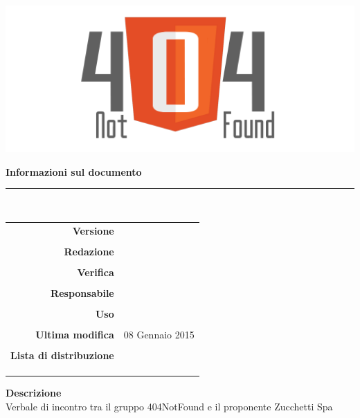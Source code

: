 \thispagestyle{empty}

\begin{titlepage}

	\begin{center}
	\begin{Huge}
		\textbf{\gruppo} \\
	\end{Huge}
	\vspace{0.5cm}
	\begin{Large}
		\textbf{\capitolato}
	\end{Large}
	
	\vspace{1cm}

	\includegraphics[scale=0.35]{../logo/logo404_Extends.png}
	\vspace{1cm}
	\begin{Huge}
		\textbf{\titDoc}
	\end{Huge}
	
	\vspace{1cm}
	\textbf{Informazioni sul documento}\\
	\rule{10cm}{.4pt} \\
	\begin{table}[h]
	\begin{center}
	\begin{tabular}{r | l}
		\textbf{Versione} & \versione \\ \\
		\textbf{Redazione} & \CaMa\\ \\
		\textbf{Verifica} & \CoMa \\ \\
		\textbf{Responsabile} & \VeFe \\ \\
		\textbf{Uso} & \uso \\ \\
		\textbf{Ultima modifica} & 08 Gennaio 2015 \\ \\
		\textbf{Lista di distribuzione} & \gruppo \\ 
			& \Vardanega \\
			& \Cardin \\
			& \Zucchetti \\
	\end{tabular}
	\end{center}
	\end{table}
		\textbf{Descrizione} \\
		Verbale di incontro tra il gruppo 404NotFound e il proponente Zucchetti Spa
	\end{center}
\end{titlepage}